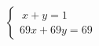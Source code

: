 \documentclass[preview]{standalone}
\begin{document}
\begin{align*}
\left\{ \begin{array}{cl} \ x + y = 1 \\[1pt] 69x + 69y = 69 \end{array} \right.
\end{align*}
\end{document}
